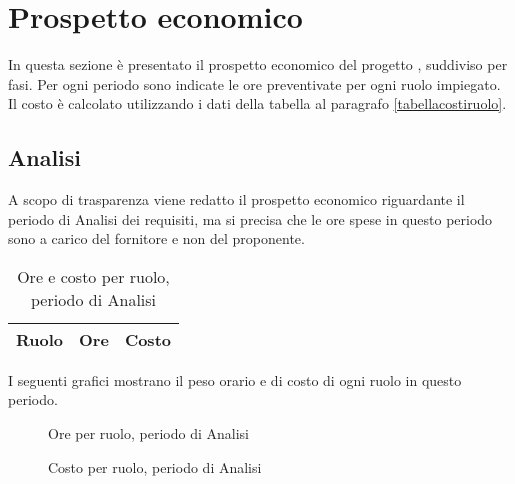 
\section{Prospetto economico}

In questa sezione è presentato il prospetto economico del progetto \ProjectName{}, suddiviso per fasi. Per ogni periodo sono indicate le ore preventivate per ogni ruolo impiegato.
Il costo è calcolato utilizzando i dati della tabella al paragrafo \ref{tabellacostiruolo}.

\subsection{Analisi}

A scopo di trasparenza viene redatto il prospetto economico riguardante il periodo di Analisi dei requisiti, ma si precisa che le ore spese in questo periodo sono a carico del fornitore e non del proponente.

\begin{table}[H]
	\centering
	\begin{tabular}{ l c c }
	\textbf{Ruolo} & \textbf{Ore} & \textbf{Costo} \\
	\hline
	
	\end{tabular}
	\caption{Ore e costo per ruolo, periodo di Analisi}
	\end{table}

I seguenti grafici mostrano il peso orario e di costo di ogni ruolo in questo periodo.

\begin{figure}[H]
\begin{tikzpicture}

	

\end{tikzpicture}
\caption{Ore per ruolo, periodo di Analisi}
\end{figure}

\begin{figure}[H]
\begin{tikzpicture}

	

\end{tikzpicture}
\caption{Costo per ruolo, periodo di Analisi}
\end{figure}

